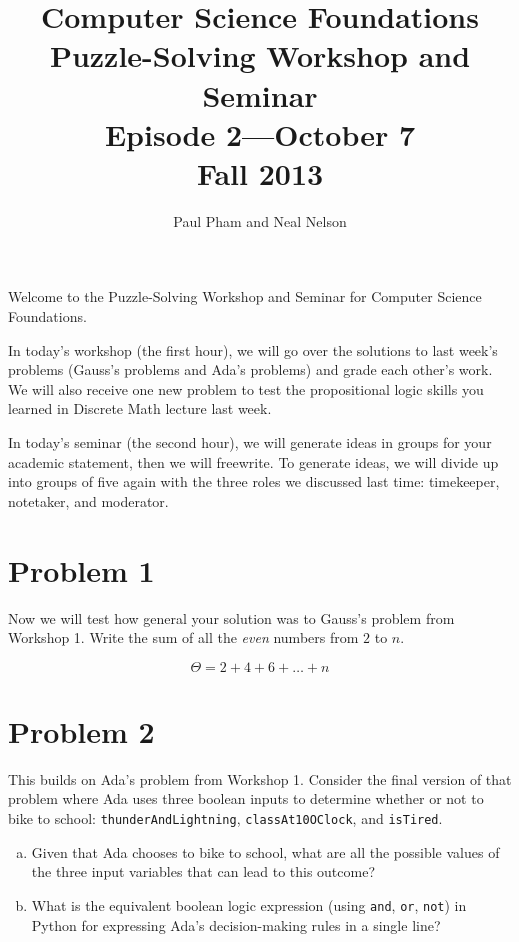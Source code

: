 \documentclass{article}
\title{Computer Science Foundations\\ Puzzle-Solving Workshop and Seminar\\
\large{Episode 2---October 7}\\
Fall 2013}
\author{Paul Pham and Neal Nelson}
\begin{document}
\maketitle

Welcome to the Puzzle-Solving Workshop and Seminar for
Computer Science Foundations.

In today's workshop (the first hour), we will go over the
solutions to last week's problems (Gauss's problems and
Ada's problems) and grade each other's work. We will
also receive one new problem to test the propositional
logic skills you learned in Discrete Math lecture last week.

In today's seminar (the second hour), we will generate ideas
in groups for your academic statement, then we will freewrite.
To generate ideas, we will divide up into groups of five again
with the three roles we discussed last time: timekeeper,
notetaker, and moderator.

\section{Problem 1}

Now we will test how general your solution was to Gauss's problem
from Workshop 1. Write the sum of all the \emph{even} numbers
from $2$ to $n$.

\begin{equation}
\Theta =  2 + 4 + 6 + \ldots + n
\end{equation}

\section{Problem 2}

This builds on Ada's problem from Workshop 1. Consider the final
version of that problem where Ada uses three boolean inputs to
determine whether or not to bike to school:
\texttt{thunderAndLightning}, \texttt{classAt10OClock},
and \texttt{isTired}.

\begin{enumerate}[(a)]
\item
Given that Ada chooses to bike to school, what are all the
possible values of the three input variables that can lead
to this outcome?
\item
What is the equivalent boolean logic expression (using
\texttt{and}, \texttt{or}, \texttt{not}) in Python
for expressing Ada's decision-making rules in a single line?
\end{enumerate}
\end{document}
